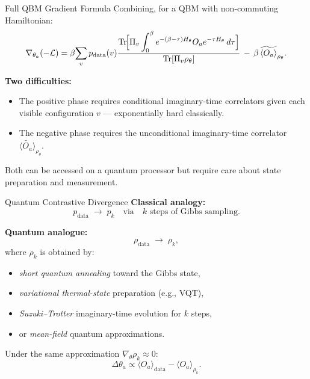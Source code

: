 \documentclass[aspectratio=169]{beamer}
\newcommand{\pdata}{p_{\mathrm{data}}}
\begin{document}
\begin{frame}{Full QBM Gradient Formula}
Combining, for a QBM with non-commuting Hamiltonian:
\[
  \nabla_{\theta_a}(-\mathcal{L})
  =
  \beta\!\sum_v
    \pdata(v)
    \frac{\displaystyle
      \Tr\!\Bigl[\Pi_v
      \int_0^\beta e^{-(\beta-\tau)H_\theta}O_a e^{-\tau H_\theta}\,d\tau
      \Bigr]}
    {\Tr[\Pi_v\rho_\theta]}
  \,-\,
  \beta\,\widetilde{\langle O_a\rangle}_{\rho_\theta}.
\]

\textbf{Two difficulties:}
\begin{itemize}
  \item The positive phase requires conditional imaginary-time correlators
        given each visible configuration $v$ — exponentially hard classically.
  \item The negative phase requires the unconditional imaginary-time correlator
        $\widetilde{\langle O_a\rangle}_{\rho_\theta}$.
\end{itemize}

Both can be accessed on a quantum processor but require care about
state preparation and measurement.
\end{frame}

\begin{frame}{Quantum Contrastive Divergence}
\textbf{Classical analogy:}
\[
  \pdata \;\longrightarrow\; p_k
  \quad\text{via}\quad
  k \text{ steps of Gibbs sampling}.
\]

\textbf{Quantum analogue:}
\[
  \rho_{\mathrm{data}} \;\longrightarrow\; \rho_k,
\]
where $\rho_k$ is obtained by:
\begin{itemize}
  \item \emph{short quantum annealing} toward the Gibbs state,
  \item \emph{variational thermal-state} preparation (e.g., VQT),
  \item \emph{Suzuki--Trotter} imaginary-time evolution for $k$ steps,
  \item or \emph{mean-field} quantum approximations.
\end{itemize}

Under the same approximation $\nabla_\theta\rho_k\approx 0$:
\[
  \Delta\theta_a
  \propto
  \langle O_a\rangle_{\mathrm{data}}
  -
  \langle O_a\rangle_{\rho_k}.
\]
\end{frame}
\end{document}
